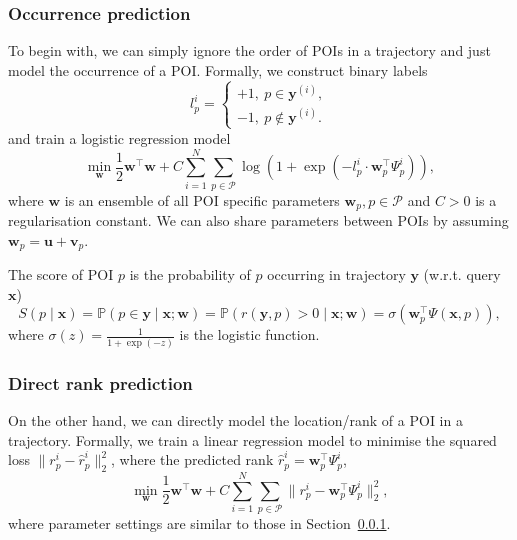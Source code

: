 \documentclass[9pt]{extarticle}
\begin{document}
\subsubsection{Occurrence prediction}
\label{sec:logistic}

To begin with, we can simply ignore the order of POIs in a trajectory and just model the occurrence of a POI.
Formally, we construct binary labels
\begin{equation*}
l_p^i = \begin{cases}
+1,~p \in \mathbf{y}^{(i)}, \\
-1,~p \notin \mathbf{y}^{(i)}.
\end{cases}
\end{equation*}
and train a logistic regression model 
\begin{equation*}
\min_{\mathbf{w}} \frac{1}{2} \mathbf{w}^\top \mathbf{w} + 
C \sum_{i=1}^N \sum_{p \in \mathcal{P}} \log \left(1 + \exp \left(- l_p^i \cdot \mathbf{w}_p^\top \Psi_p^i \right) \right), %
\end{equation*}
where $\mathbf{w}$ is an ensemble of all POI specific parameters $\mathbf{w}_p, p \in \mathcal{P}$ and $C>0$ is a regularisation constant.
We can also share parameters between POIs by assuming $\mathbf{w}_p = \mathbf{u} + \mathbf{v}_p$.

The score of POI $p$ is the probability of $p$ occurring in trajectory $\mathbf{y}$ (w.r.t. query $\mathbf{x}$)
\begin{equation*}
S(p \mid \mathbf{x})
= \mathbb{P}(p \in \mathbf{y} \mid \mathbf{x}; \mathbf{w})
= \mathbb{P}(r(\mathbf{y}, p) > 0 \mid \mathbf{x}; \mathbf{w})
= \sigma \left( \mathbf{w}_p^\top \Psi(\mathbf{x}, p) \right),
\end{equation*}
where $\sigma(z) = \frac{1}{1+\exp({-z})}$ is the logistic function.



\subsubsection{Direct rank prediction}
\label{sec:linear}

On the other hand, we can directly model the location/rank of a POI in a trajectory.
Formally, we train a linear regression model to minimise the squared loss $\|r_p^i - \hat{r}_p^i \|_2^2$, 
where the predicted rank $\hat{r}_p^i = \mathbf{w}_p^\top \Psi_p^i$,
\begin{equation*}
\min_{\mathbf{w}} \frac{1}{2} \mathbf{w}^\top \mathbf{w} + C \sum_{i=1}^N \sum_{p \in \mathcal{P}} \|r_p^i - \mathbf{w}_p^\top \Psi_p^i \|_2^2,
\end{equation*}
where parameter settings are similar to those in Section~\ref{sec:logistic}.
\end{document}

